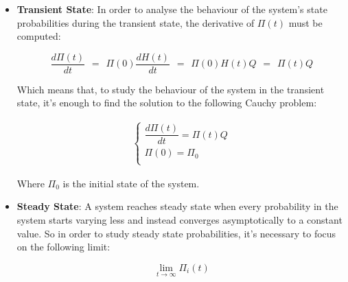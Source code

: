 \documentclass[12pt,a4paper]{article}
\begin{document}
\begin{itemize}
\item \textbf{Transient State}: In order to analyse the behaviour of the system's state probabilities during the transient state, the derivative of $\Pi(t)$ must be computed:

$$
\frac{d\Pi(t)}{dt}
\hspace{5pt}=\hspace{5pt}
\Pi(0)\frac{dH(t)}{dt}
\hspace{5pt}=\hspace{5pt}
\Pi(0)H(t)Q
\hspace{5pt}=\hspace{5pt}
\Pi(t)Q
$$

\noindent
Which means that, to study the behaviour of the system in the transient state, it's enough to find the solution to the following Cauchy problem:

$$
\begin{matrix}
\begin{cases}
\dfrac{d\Pi(t)}{dt}=\Pi(t)Q\\
\Pi(0)=\Pi_0 \\
\end{cases}
\end{matrix}
$$

\noindent
Where $\Pi_0$ is the initial state of the system.
\item \textbf{Steady State}: A system reaches steady state when every probability in the system starts varying less and instead converges asymptotically to a constant value. So in order to study steady state probabilities, it's necessary to focus on the following limit:

$$
\lim_{t\rightarrow \infty}{\Pi_i(t)}
$$
\end{itemize}
\newpage
\end{document}
